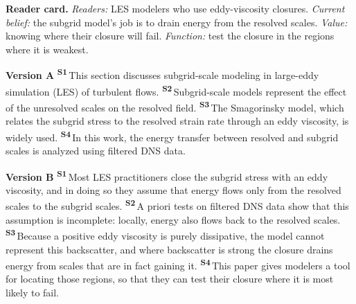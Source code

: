 \documentclass[11pt]{article}
\newcommand{\sn}[1]{\textsuperscript{\sffamily\bfseries\color{accent}S#1}\,} %
\begin{document}
\textbf{Reader card.} \emph{Readers:} LES modelers who use eddy-viscosity closures. \emph{Current belief:} the
subgrid model's job is to drain energy from the resolved scales. \emph{Value:} knowing where their closure will
fail. \emph{Function:} test the closure in the regions where it is weakest.

\begin{panel}[breakable=false]
\textbf{Version A}\quad
\sn{1}This section discusses subgrid-scale modeling in large-eddy simulation (LES) of turbulent flows.
\sn{2}Subgrid-scale models represent the effect of the unresolved scales on the resolved field.
\sn{3}The Smagorinsky model, which relates the subgrid stress to the resolved strain rate through an eddy
viscosity, is widely used.
\sn{4}In this work, the energy transfer between resolved and subgrid scales is analyzed using filtered DNS data.
\end{panel}

\begin{panel}[breakable=false]
\textbf{Version B}\quad
\sn{1}Most LES practitioners close the subgrid stress with an eddy viscosity, and in doing so they assume that
energy flows only from the resolved scales to the subgrid scales.
\sn{2}A priori tests on filtered DNS data show that this assumption is incomplete: locally, energy also flows
back to the resolved scales.
\sn{3}Because a positive eddy viscosity is purely dissipative, the model cannot represent this backscatter, and
where backscatter is strong the closure drains energy from scales that are in fact gaining it.
\sn{4}This paper gives modelers a tool for locating those regions, so that they can test their closure where it
is most likely to fail.
\end{panel}
\end{document}
